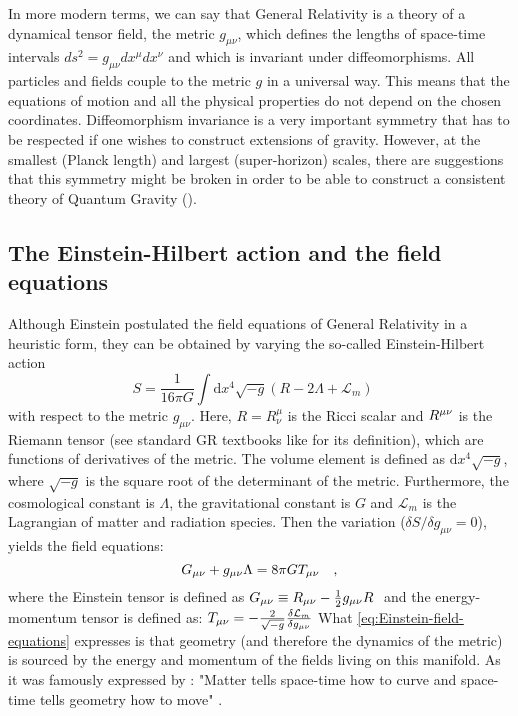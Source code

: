 In more modern terms, we can say that General Relativity is a theory of 
a dynamical tensor field, the metric $g_{\mu \nu}$, which defines the lengths 
of space-time intervals $ds^2 = g_{\mu \nu} dx^{\mu} dx^{\nu}$ and which is invariant under diffeomorphisms. 
All particles and fields couple to the metric $g$ in a universal way.
This means that the equations of motion and all the physical properties do not depend on the chosen coordinates.
Diffeomorphism invariance is a very important symmetry that has to be respected if one wishes to construct
extensions of gravity. 
However, at the smallest (Planck length) and largest (super-horizon) scales, there are suggestions
that this symmetry might be broken in order to be able to construct a consistent theory of Quantum Gravity
(\cite{cite Rovelli}).



\subsection{The Einstein-Hilbert action and the field equations \label{sub:Einstein-Hilbert}}

Although Einstein postulated the field equations of General Relativity in a heuristic
form, they can be obtained by varying the so-called Einstein-Hilbert action
\begin{equation}\label{eq:Einstein-Hilbert action}
S = \frac{1}{16 \pi G} \int \textrm{d}x^4 \sqrt{-g}\left( R - 2\Lambda + \mathcal{L}_m \right) \quad 
\end{equation}
with respect to the metric $g_{\mu \nu}$.
Here, $R=R^\mu_\nu$ is the Ricci scalar and $R^{\mu \nu}$ is the Riemann tensor (see standard GR textbooks like \cite{wald} for its definition), 
which are functions of derivatives of the metric. The volume element is defined as $\textrm{d}x^4 \sqrt{-g}$, where
$\sqrt{-g}$ is the square root of the determinant of the metric.
Furthermore, the cosmological constant is $\Lambda$, the gravitational constant is $G$ and $\mathcal{L}_m $ is the Lagrangian of matter and radiation species.
Then the variation ($\delta S / \delta g_{\mu \nu} = 0$), yields the field equations:
\begin{equation}\label{eq:Einstein-field-equations}
G_{\mu \nu} + g_{\mu \nu} \Lambda = 8 \pi G T_{\mu \nu} \quad ,
\end{equation}
where the Einstein tensor is defined as $G_{\mu \nu} \equiv R_{\mu \nu} - \frac{1}{2}g_{\mu \nu} R \;$ and the 
energy-momentum tensor is defined as:
\beeqp$
T_{\mu \nu} = -\frac{2}{\sqrt{-g}} \frac{\delta \mathcal{L}_m}{\delta g_{\mu \nu}}
$
What \cref{eq:Einstein-field-equations} expresses is that geometry (and therefore the dynamics of the metric) is sourced by 
the energy and momentum of the fields living on this manifold.
As it was famously expressed by \cite{Misner, Wheeler, Gravitation}:
"Matter tells space-time how to curve and space-time tells geometry how to move" .

